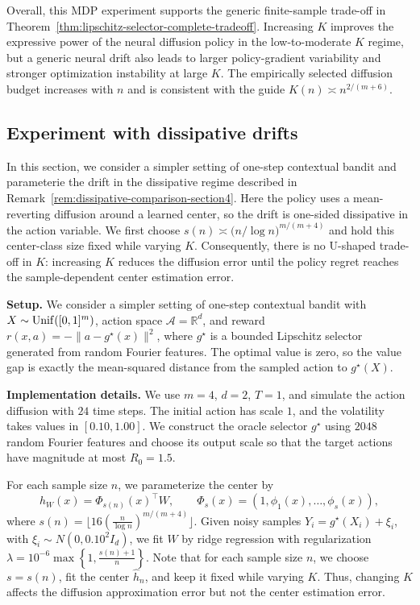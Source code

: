 \documentclass{article}
\newcommand{\1}{\mathbbm{1}}
\numberwithin{equation}{section}
\begin{document}
Overall, this MDP experiment supports the generic finite-sample trade-off in Theorem~\ref{thm:lipschitz-selector-complete-tradeoff}. Increasing \(K\) improves the expressive power of the neural diffusion policy in the low-to-moderate \(K\) regime, but a generic neural drift also leads to larger policy-gradient variability and stronger optimization instability at large \(K\). The empirically selected diffusion budget increases with \(n\) and is consistent with the guide \(K(n)\asymp n^{2/(m+6)}\).



\subsection{Experiment with dissipative drifts}
\label{sec:simple_exp}
In this section, we consider a simpler setting of one-step contextual bandit and parameterie the drift in the dissipative regime described in
Remark~\ref{rem:dissipative-comparison-section4}. Here the policy uses a
mean-reverting diffusion around a learned center, so the drift is
one-sided dissipative in the action variable. We first choose $s(n)\asymp \big({n}/{\log n}\big)^{m/(m+4)}$
and hold this center-class size fixed while varying \(K\). Consequently,
there is no U-shaped trade-off in \(K\): increasing \(K\) reduces the
diffusion error until the policy regret reaches the sample-dependent center
estimation error.

{\bf Setup.}
We consider a simpler setting of one-step contextual bandit with
\(X\sim {\rm Unif}([0,1]^m)\), action space
\(\mathcal A=\mathbb R^d\), and reward
\(r(x,a)=-\|a-g^\star(x)\|^2\), where \(g^\star\) is a bounded
Lipschitz selector generated from random Fourier features. The optimal
value is zero, so the value gap is exactly the mean-squared distance from
the sampled action to \(g^\star(X)\).


{\bf Implementation details.}
We use \(m=4\), \(d=2\), \(T=1\), and simulate the action diffusion with
\(24\) time steps. The initial action has scale \(1\), and the volatility
takes values in \([0.10,1.00]\). 
We construct the oracle selector $g^\star$
 using \(2048\) random Fourier features and choose its output scale so that the target actions have magnitude at most $R_0=1.5$.

For each sample size \(n\), we parameterize the center by
\[
h_W(x)=\Phi_{s(n)}(x)^\top W,\qquad
\Phi_s(x)=(1,\phi_1(x),\ldots,\phi_s(x)),
\]
where $s(n)
=
\lfloor
16\left(\frac{n}{\log n}\right)^{m/(m+4)}
\rfloor$. Given noisy samples
\(Y_i=g^\star(X_i)+\xi_i\), with
\(\xi_i\sim N(0,0.10^2I_d)\), we fit \(W\) by ridge regression with
regularization $\lambda
=
10^{-6}\max\left\{1,\frac{s(n)+1}{n}\right\}$.
Note that for each sample size \(n\), we choose \(s=s(n)\), fit the center
\(\widehat h_n\), and keep it fixed while varying \(K\). Thus, changing
\(K\) affects the diffusion approximation error but not the center
estimation error.
\end{document}
